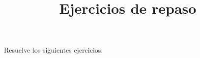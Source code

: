 

\title{Ejercicios de repaso \vspace{-2cm}}
\author{}
\date{ }

\renewcommand\thechoice{\Alph{choice})}
\newcommand\choicelabel{\thechoice}

\newenvironment{choices}%
  {\list{\choicelabel}%
     {\usecounter{choice}\def\makelabel##1{\hss\llap{##1}}%
       \settowidth{\leftmargin}{W.\hskip\labelsep\hskip 2.5em}%
       \def\choice{%
         \item
       } %
       \labelwidth\leftmargin\advance\labelwidth-\labelsep
       \topsep=0pt
       \partopsep=0pt
     }%
  }%
  {\endlist}

\newenvironment{oneparchoices}%
  {%
    \setcounter{choice}{0}%
    \def\choice{%
      \refstepcounter{choice}%
      \ifnum\value{choice}>1\relax
        \penalty -50\hskip 1em plus 1em\relax
      \fi
      \choicelabel
      \nobreak\enskip
    }%
    \ifvmode\else\enskip\fi
    \ignorespaces
  }%
  {}


\maketitle
\fontsize{14}{14}\selectfont

Resuelve los siguientes ejercicios:

